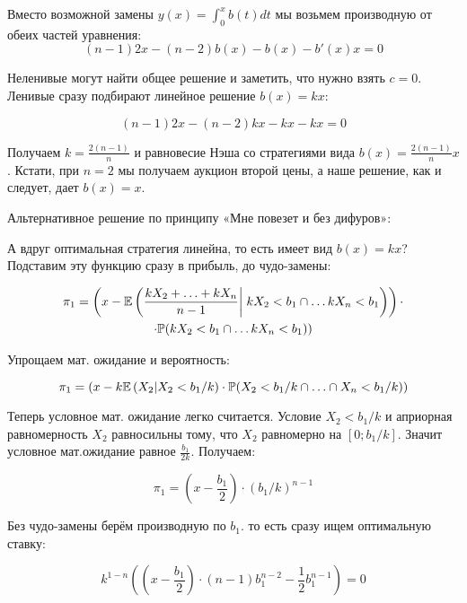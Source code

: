 \begin{enumerate}
Вместо возможной замены $ y(x)=\int_{0}^{x}b(t)dt $ мы возьмем производную от обеих частей уравнения:
\begin{equation}
(n-1)2x-(n-2)b(x)-b(x)-b'(x)x=0
\end{equation}

Неленивые могут найти общее решение и заметить, что нужно взять $ c=0 $. Ленивые сразу подбирают линейное решение $ b(x)=kx $:

\begin{equation}
(n-1)2x-(n-2)kx-kx-kx=0
\end{equation}

Получаем $ k=\frac{2(n-1)}{n} $ и равновесие Нэша со стратегиями вида $ b(x)=\frac{2(n-1)}{n}x $. Кстати, при $ n=2 $ мы получаем аукцион второй цены, а наше решение, как и следует, дает $ b(x)=x $.

Альтернативное решение по принципу «Мне повезет и без дифуров»:

А вдруг оптимальная стратегия линейна, то есть имеет вид $ b(x)=kx $? Подставим эту функцию сразу в прибыль, до чудо-замены:

\begin{multline}
\pi_{1}=\left(x-\E\left(\frac{kX_{2}+\ldots+kX_{n}}{n-1}\right|\left.\vphantom{\frac{kX_{2}+\ldots+kX_{n}}{n-1}}kX_{2}<b_{1}\cap \ldots kX_{n}<b_{1}\right)\right)\cdot \\
\cdot \P(kX_{2}<b_{1}\cap \ldots kX_{n}<b_{1}))
\end{multline}

Упрощаем мат. ожидание и вероятность:

\begin{equation}
\pi_{1}=(x-k\mathbb{E}\left(X_{2}|X_{2}<b_{1}/k\right)\cdot \mathbb{P}(X_{2}<b_{1}/k\cap \ldots \cap X_{n}<b_{1}/k))
\end{equation}

Теперь условное мат. ожидание легко считается. Условие $ X_{2}<b_{1}/k $ и априорная равномерность $ X_{2} $ равносильны тому, что $ X_{2} $ равномерно на $ [0;b_{1}/k] $. Значит условное мат.ожидание равное $ \frac{b_{1}}{2k} $. Получаем:

\begin{equation}
\pi_{1}=\left( x-\frac{b_{1}}{2}\right)\cdot (b_{1}/k)^{n-1}
\end{equation}

Без чудо-замены берём производную по $ b_{1} $. то есть сразу ищем оптимальную ставку:

\begin{equation}
k^{1-n}\left( \left( x-\frac{b_{1}}{2} \right)\cdot (n-1)b_{1}^{n-2}-\frac{1}{2}b_{1}^{n-1} \right)=0
\end{equation}


\end{enumerate}
